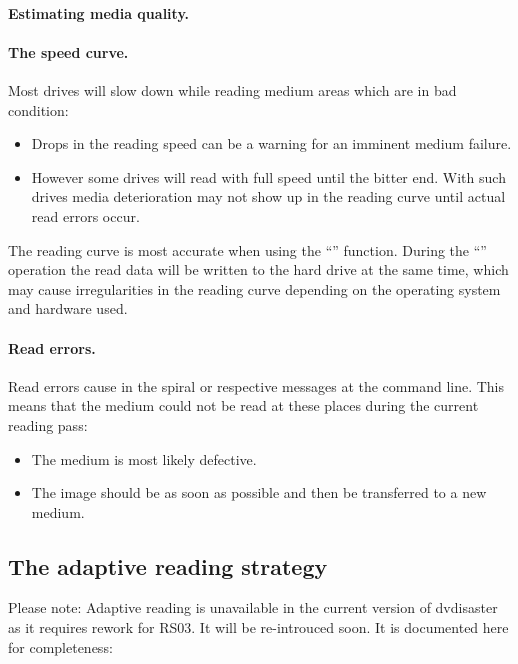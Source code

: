 \paragraph{Estimating media quality.}\quad

\medskip

\paragraph{The speed curve.} Most drives
will slow down while reading medium areas which are in bad condition:

\begin{itemize}
\item Drops in the reading speed can be a warning for an imminent medium failure.
\item However some drives will read with full speed until the bitter end.
  With such drives media deterioration may not show up in the reading
  curve until actual read errors occur.
\end{itemize}

  The reading curve is most accurate when using
  the ``'' function.
  During the ``'' operation the
  read data will be written to the hard
  drive at the same time, which may cause irregularities in the reading curve
  depending on the operating system and hardware used.

\paragraph{Read errors.} Read errors cause  in
the spiral or respective messages at the command line. This means
that the medium could not be read at these places during the current reading pass:

\begin{itemize}
\item The medium is most likely defective.
\item The image should be  as
  soon as possible and then be transferred to a new medium.
\end{itemize}

\subsection{The adaptive reading strategy}
\label{background-adaptive}

Please note: Adaptive reading is unavailable in the current
version of dvdisaster as it requires rework for RS03. It
will be re-introuced soon. It is documented here for completeness:

